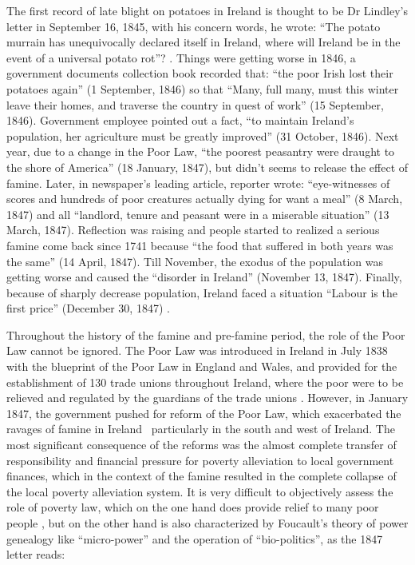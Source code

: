 The first record of late blight on potatoes in Ireland is thought to be Dr Lindley's letter in September 16, 1845, with his concern words, he wrote: ``The potato murrain has unequivocally declared itself in Ireland, where will Ireland be in the event of a universal potato rot''? \citep{kelly1995great}. Things were getting worse in 1846, a government documents collection book recorded that: ``the poor Irish lost their potatoes again'' (1 September, 1846) so that ``Many, full many, must this winter leave their homes, and traverse the country in quest of work'' (15 September, 1846). Government employee pointed out a fact, ``to maintain Ireland's population, her agriculture must be greatly improved'' (31 October, 1846). Next year, due to a change in the Poor Law, ``the poorest peasantry were draught to the shore of America'' (18 January, 1847), but didn't seems to release the effect of famine. Later, in newspaper's leading article, reporter wrote: ``eye-witnesses of scores and hundreds of poor creatures actually dying for want a meal'' (8 March, 1847) and all ``landlord, tenure and peasant were in a miserable situation'' (13 March, 1847). Reflection was raising and people started to realized a serious famine come back since 1741 because ``the food that suffered in both years was the same'' (14 April, 1847). Till November, the exodus of the population was getting worse and caused the ``disorder in Ireland'' (November 13, 1847). Finally, because of sharply decrease population, Ireland faced a situation ``Labour is the first price'' (December 30, 1847) \citep{times1880famineletter}.

Throughout the history of the famine and pre-famine period, the role of the Poor Law cannot be ignored. The Poor Law was introduced in Ireland in July 1838 with the blueprint of the Poor Law in England and Wales, and provided for the establishment of 130 trade unions throughout Ireland, where the poor were to be relieved and regulated by the guardians of the trade unions \citep{o1985new}. However, in January 1847, the government pushed for reform of the Poor Law, which exacerbated the ravages of famine in Ireland \textendash\ particularly in the south and west of Ireland. The most significant consequence of the reforms was the almost complete transfer of responsibility and financial pressure for poverty alleviation to local government finances, which in the context of the famine resulted in the complete collapse of the local poverty alleviation system. It is very difficult to objectively assess the role of poverty law, which on the one hand does provide relief to many poor people \citep{mchugh1986famine}, but on the other hand is also characterized by Foucault's theory of power genealogy like ``micro-power'' and the operation of ``bio-politics'', as the 1847 letter reads:

